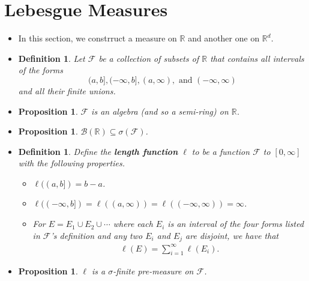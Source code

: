 \documentclass[10pt]{article}
\newtheorem{definition}[lemma]{Definition}
\newtheorem{proposition}[lemma]{Proposition}
\numberwithin{lemma}{section}
\newcommand{\mcal}[1]{\mathcal{#1}}
\newcommand{\Real}{\mathbb{R}}
\begin{document}
\section{Lebesgue Measures}

\begin{itemize}
  \item In this section, we constrruct a measure on $\Real$ and another one on $\Real^d$.
  
  \item \begin{definition} \label{def:collection-of-intervals}
    Let $\mcal{F}$ be a collection of subsets of $\Real$ that contains all intervals of the forms $$(a,b], (-\infty, b], (a,\infty), \mbox{ and } (-\infty, \infty)$$ and all their finite unions.
  \end{definition}

  \item \begin{proposition}
    $\mcal{F}$ is an algebra (and so a semi-ring) on $\Real$.
  \end{proposition}

  \item \begin{proposition}
    $\mcal{B}(\Real) \subseteq \sigma(\mcal{F}) $.
  \end{proposition}

  \item \begin{definition}
    Define the {\bf length function} $\ell$ to be a function $\mcal{F}$ to $[0,\infty]$ with the following properties.
    \begin{itemize}
      \item $\ell((a,b]) = b-a$.
      \item $\ell((-\infty,b]) = \ell((a,\infty)) = \ell((-\infty,\infty)) = \infty$.
      \item For $E = E_1 \cup E_2 \cup \dotsb$ where each $E_i$ is an interval of the four forms listed in $\mcal{F}$'s definition and any two $E_i$ and $E_j$ are disjoint, we have that
      \begin{align*}
        \ell(E) = \sum_{i=1}^\infty \ell(E_i).
      \end{align*} 
    \end{itemize}
  \end{definition}

  \item \begin{proposition}
    $\ell$ is a $\sigma$-finite pre-measure on $\mcal{F}$.
  \end{proposition}


\end{itemize}
\end{document}
